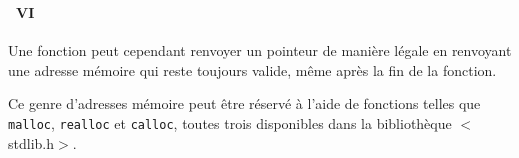\begin{frame}%
  \frametitle{\secname}
  \framesubtitle{\subsecname~VI}

  Une fonction peut cependant renvoyer un pointeur de manière légale en renvoyant une adresse mémoire qui reste toujours valide,
  même après la fin de la fonction. 
  \vspace{0.5cm}
  \par
  Ce genre d'adresses mémoire peut être réservé à l'aide de fonctions telles que \texttt{malloc}, \texttt{realloc} et \texttt{calloc},
  toutes trois disponibles dans la bibliothèque $<$stdlib.h$>$.
\end{frame}

